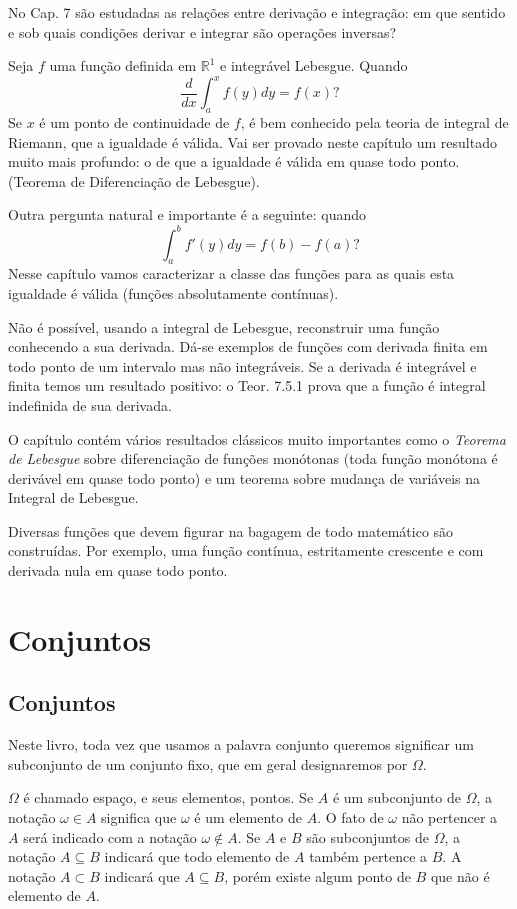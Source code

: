 \documentclass[
]{book}
\begin{document}
No Cap. 7 são estudadas as relações entre derivação e integração: em que sentido e sob quais condições derivar e integrar são operações inversas?

Seja \(f\) uma função definida em \(\mathbb{R}^1\) e integrável Lebesgue. Quando \[ \frac{d}{dx} \int_{a}^{x} f(y) dy = f(x)? \] Se \(x\) é um ponto de continuidade de \(f\), é bem conhecido pela teoria de integral de Riemann, que a igualdade é válida. Vai ser provado neste capítulo um resultado muito mais profundo: o de que a igualdade é válida em quase todo ponto. (Teorema de Diferenciação de Lebesgue).

Outra pergunta natural e importante é a seguinte: quando \[ \int_{a}^{b} f'(y) dy = f(b) - f(a)? \] Nesse capítulo vamos caracterizar a classe das funções para as quais esta igualdade é válida (funções absolutamente contínuas).

Não é possível, usando a integral de Lebesgue, reconstruir uma função conhecendo a sua derivada. Dá-se exemplos de funções com derivada finita em todo ponto de um intervalo mas não integráveis. Se a derivada é integrável e finita temos um resultado positivo: o Teor. 7.5.1 prova que a função é integral indefinida de sua derivada.

O capítulo contém vários resultados clássicos muito importantes como o \emph{Teorema de Lebesgue} sobre diferenciação de funções monótonas (toda função monótona é derivável em quase todo ponto) e um teorema sobre mudança de variáveis na Integral de Lebesgue.

Diversas funções que devem figurar na bagagem de todo matemático são construídas. Por exemplo, uma função contínua, estritamente crescente e com derivada nula em quase todo ponto.

\chapter{Conjuntos}\label{cap0}

\section{Conjuntos}\label{cap01}

Neste livro, toda vez que usamos a palavra conjunto queremos significar um subconjunto de um conjunto fixo, que em geral designaremos por \(\Omega\).

\(\Omega\) é chamado espaço, e seus elementos, pontos.
Se \(A\) é um subconjunto de \(\Omega\), a notação \(\omega \in A\) significa que \(\omega\) é um elemento de \(A\).
O fato de \(\omega\) não pertencer a \(A\) será indicado com a notação \(\omega \notin A\).
Se \(A\) e \(B\) são subconjuntos de \(\Omega\), a notação \(A \subseteq B\) indicará que todo elemento de \(A\) também pertence a \(B\).
A notação \(A \subset B\) indicará que \(A \subseteq B\), porém existe algum ponto de \(B\) que não é elemento de \(A\).
\end{document}
